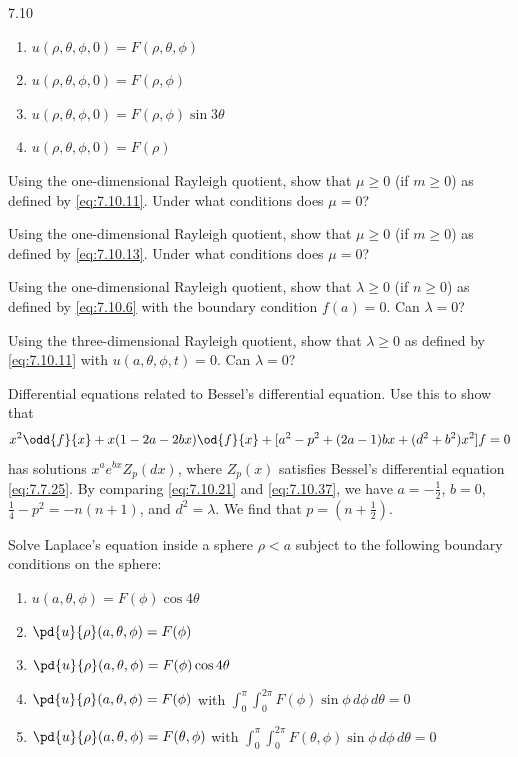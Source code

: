 \begin{exercises}{7.10}
\begin{enumerate}
\item[(a)] $u(\rho,\theta,\phi,0) = F(\rho,\theta,\phi)$
\item[(b)] $u(\rho,\theta,\phi,0) = F(\rho,\phi)$
\item[(c)] $u(\rho,\theta,\phi,0) = F(\rho,\phi)\sin 3\theta$
\item[(d)] $u(\rho,\theta,\phi,0) = F(\rho)$
\end{enumerate}

\item Using the one-dimensional Rayleigh quotient, show that $\mu \geq 0$ (if $m \geq 0$) as defined by \eqref{eq:7.10.11}.  Under what conditions does $\mu = 0$?

\item Using the one-dimensional Rayleigh quotient, show that $\mu \geq 0$ (if $m \geq 0$) as defined by \eqref{eq:7.10.13}.  Under what conditions does $\mu = 0$?

\item Using the one-dimensional Rayleigh quotient, show that $\lambda \geq 0$ (if $n \geq 0$) as defined by \eqref{eq:7.10.6} with the boundary condition $f(a) = 0$.  Can $\lambda = 0$?

\item Using the three-dimensional Rayleigh quotient, show that $\lambda \geq 0$ as defined by \eqref{eq:7.10.11} with $u(a,\theta,\phi,t) = 0$.  Can $\lambda = 0$?

\item Differential equations related to Bessel's differential equation.  Use this to show that
\begin{equation}
x^2\odd{f}{x} + x(1-2a-2bx)\od{f}{x} + [a^2-p^2+(2a-1)bx+(d^2+b^2)x^2]f = 0
\label{eq:7.10.37}
\end{equation}
has solutions $x^a e^{bx}Z_p(dx)$, where $Z_p(x)$ satisfies Bessel's differential equation \eqref{eq:7.7.25}.  By comparing \eqref{eq:7.10.21} and \eqref{eq:7.10.37}, we have $a = -\frac{1}{2}$, $b = 0$, $\frac{1}{4} - p^2 = -n(n+1)$, and $d^2 = \lambda$.  We find that $p = (n + \frac{1}{2})$.

\item Solve Laplace's equation inside a sphere $\rho < a$ subject to the following boundary conditions on the sphere:
\begin{enumerate}
\item[(a)] $u(a,\theta,\phi) = F(\phi)\cos 4\theta$
\item[(b)] $\pd{u}{\rho}(a,\theta,\phi) = F(\phi)$
\item[(c)] $\pd{u}{\rho}(a,\theta,\phi) = F(\phi)\cos 4\theta$
\item[(d)] $\pd{u}{\rho}(a,\theta,\phi) = F(\phi)$ with $\int_0^\pi\int_0^{2\pi}F(\phi)\sin\phi\,d\phi\,d\theta = 0$
\item[(e)] $\pd{u}{\rho}(a,\theta,\phi) = F(\theta,\phi)$ with $\int_0^\pi\int_0^{2\pi}F(\theta,\phi)\sin\phi\,d\phi\,d\theta = 0$
\end{enumerate}


\end{exercises}
